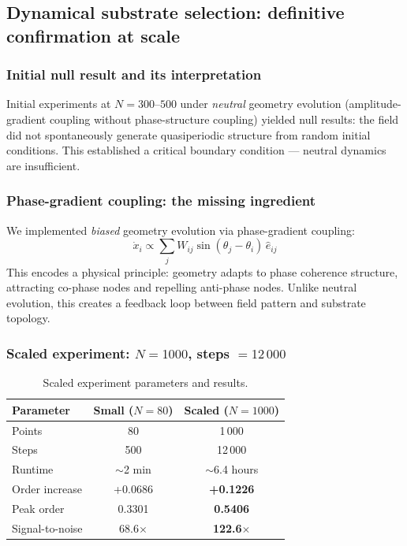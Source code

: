 \documentclass[12pt,a4paper]{article}
\theoremstyle{plain}
\theoremstyle{definition}
\begin{document}
\subsection{Dynamical substrate selection: definitive confirmation at scale}
\label{sec:dynamical}

\subsubsection{Initial null result and its interpretation}

Initial experiments at $N = 300$--$500$ under \emph{neutral} geometry
evolution (amplitude-gradient coupling without phase-structure coupling)
yielded null results: the field did not spontaneously generate quasiperiodic
structure from random initial conditions. This established a critical
boundary condition --- neutral dynamics are insufficient.

\subsubsection{Phase-gradient coupling: the missing ingredient}

We implemented \emph{biased} geometry evolution via phase-gradient
coupling:
\begin{equation}
\dot{x}_i \propto \sum_j W_{ij} \sin(\theta_j - \theta_i)\, \hat{e}_{ij}
\end{equation}
This encodes a physical principle: geometry adapts to phase coherence
structure, attracting co-phase nodes and repelling anti-phase nodes.
Unlike neutral evolution, this creates a feedback loop between field
pattern and substrate topology.

\subsubsection{Scaled experiment: $N = 1000$, steps $= 12\,000$}

\begin{table}[H]
\centering
\caption{Scaled experiment parameters and results.}
\label{tab:scaled}
\begin{tabular}{lcc}
\toprule
\textbf{Parameter} & \textbf{Small ($N=80$)} & \textbf{Scaled ($N=1000$)} \\
\midrule
Points          & 80    & 1\,000 \\
Steps           & 500   & 12\,000 \\
Runtime         & $\sim$2 min & $\sim$6.4 hours \\
Order increase  & +0.0686 & \textbf{+0.1226} \\
Peak order      & 0.3301  & \textbf{0.5406} \\
Signal-to-noise & 68.6$\times$ & \textbf{122.6$\times$} \\
\bottomrule
\end{tabular}
\end{table}
\end{document}
